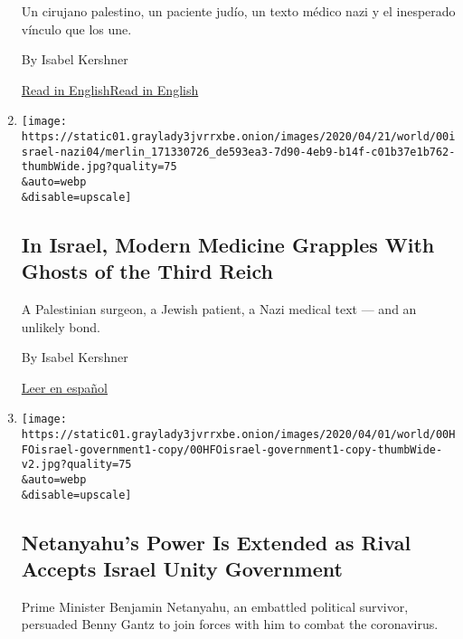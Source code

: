 \begin{enumerate}
  Un cirujano palestino, un paciente judío, un texto médico nazi y el
  inesperado vínculo que los une.

  By Isabel Kershner

  \href{https://www.nytimes3xbfgragh.onion/2020/05/12/world/middleeast/nazi-medical-text-israel.html}{Read
  in
  English}\href{https://www.nytimes3xbfgragh.onion/2020/05/12/world/middleeast/nazi-medical-text-israel.html}{Read
  in English}
\item
  \href{/2020/05/12/world/middleeast/nazi-medical-text-israel.html}{}

  \texttt{[image: https://static01.graylady3jvrrxbe.onion/images/2020/04/21/world/00israel-nazi04/merlin\_171330726\_de593ea3-7d90-4eb9-b14f-c01b37e1b762-thumbWide.jpg?quality=75\\\&auto=webp\\\&disable=upscale]}

  \hypertarget{in-israel-modern-medicine-grapples-with-ghosts-of-the-third-reich}{%
  \subsection{In Israel, Modern Medicine Grapples With Ghosts of the
  Third
  Reich}\label{in-israel-modern-medicine-grapples-with-ghosts-of-the-third-reich}}

  A Palestinian surgeon, a Jewish patient, a Nazi medical text --- and
  an unlikely bond.

  By Isabel Kershner

  \href{https://www.nytimes3xbfgragh.onion/es/2020/05/15/espanol/mundo/libro-nazi-israel-medicina.html}{Leer
  en español}
\item
  \href{/2020/04/20/world/middleeast/netanyahu-israel-government-gantz.html}{}

  \texttt{[image: https://static01.graylady3jvrrxbe.onion/images/2020/04/01/world/00HFOisrael-government1-copy/00HFOisrael-government1-copy-thumbWide-v2.jpg?quality=75\\\&auto=webp\\\&disable=upscale]}

  \hypertarget{netanyahus-power-is-extended-as-rival-accepts-israel-unity-government}{%
  \subsection{Netanyahu's Power Is Extended as Rival Accepts Israel
  Unity
  Government}\label{netanyahus-power-is-extended-as-rival-accepts-israel-unity-government}}

  Prime Minister Benjamin Netanyahu, an embattled political survivor,
  persuaded Benny Gantz to join forces with him to combat the
  coronavirus.


\end{enumerate}
